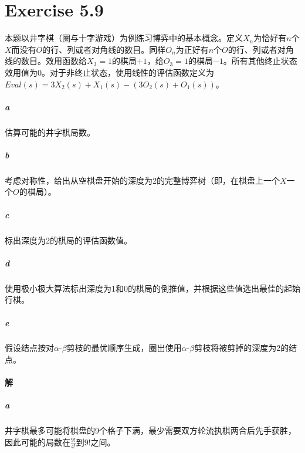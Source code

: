 \documentclass{article}
\begin{document}
\section{Exercise 5.9}
本题以井字棋（圈与十字游戏）为例练习博弈中的基本概念。定义$X_n$为恰好有$n$个$X$而没有$O$的行、列或者对角线的数目。同样$O_n$为正好有$n$个$O$的行、列或者对角线的数目。效用函数给$X_3 = 1$的棋局$+1$，给$O_3 = 1$的棋局$-1$。所有其他终止状态效用值为0。对于非终止状态，使用线性的评估函数定义为$\textit{Eval}(s) = 3X_2(s) + X_1(s) - (3O_2(s) + O_1(s))$。
\subparagraph{a}
估算可能的井字棋局数。
\subparagraph{b}
考虑对称性，给出从空棋盘开始的深度为2的完整博弈树（即，在棋盘上一个$X$一个$O$的棋局）。
\subparagraph{c}
标出深度为2的棋局的评估函数值。
\subparagraph{d}
使用极小极大算法标出深度为1和0的棋局的倒推值，并根据这些值选出最佳的起始行棋。
\subparagraph{e}
假设结点按对$\alpha$-$\beta$剪枝的最优顺序生成，圈出使用$\alpha$-$\beta$剪枝将被剪掉的深度为2的结点。

\paragraph{解}
\subparagraph{a}
井字棋最多可能将棋盘的9个格子下满，最少需要双方轮流执棋两合后先手获胜，因此可能的局数在$\frac{9!}{4!}$到$9!$之间。
\end{document}
